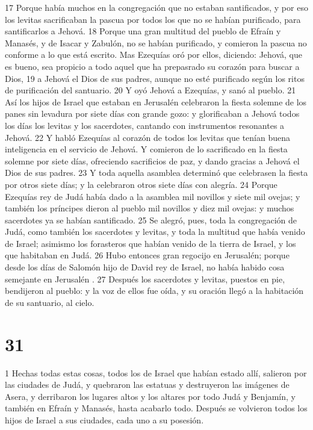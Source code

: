 17 Porque había muchos en la congregación que no estaban santificados, y por eso los levitas sacrificaban la pascua por todos los que no se habían purificado, para santificarlos a Jehová.
18 Porque una gran multitud del pueblo de Efraín y Manasés, y de Isacar y Zabulón, no se habían purificado, y comieron la pascua no conforme a lo que está escrito. Mas Ezequías oró por ellos, diciendo: Jehová, que es bueno, sea propicio a todo aquel que ha prepasrado su corazón para buscar a Dios,
19 a Jehová el Dios de sus padres, aunque no esté purificado según los ritos de  purificación del santuario.
20 Y oyó Jehová a Ezequías, y sanó al pueblo.
21 Así los hijos de Israel que estaban en Jerusalén celebraron la fiesta solemne de los panes sin levadura por siete días con grande gozo: y glorificaban a Jehová todos los días los levitas y los sacerdotes, cantando con instrumentos resonantes a Jehová.
22 Y habló Ezequías al corazón de todos los levitas que tenían buena inteligencia en el servicio de Jehová. Y comieron de lo sacrificado en la fiesta solemne por siete días, ofreciendo sacrificios de paz, y dando gracias a Jehová el Dios de sus padres.
23 Y toda aquella asamblea determinó que celebrasen la fiesta por otros siete días; y la celebraron otros siete días con alegría.
24 Porque Ezequías rey de Judá había dado a la asamblea mil novillos y siete mil ovejas; y también los príncipes dieron al pueblo mil novillos y diez mil ovejas: y muchos sacerdotes ya se habían santificado.
25 Se alegró, pues, toda la congregación de Judá, como también los sacerdotes y levitas, y toda la multitud que había venido de Israel; asimismo los forasteros que habían venido de la tierra de Israel, y los que habitaban en Judá.
26 Hubo entonces gran regocijo en Jerusalén; porque desde los días de Salomón hijo de David rey de Israel, no había habido cosa semejante en Jerusalén .
27 Después los sacerdotes y levitas, puestos en pie, bendijeron al pueblo: y la voz de ellos fue oída, y su oración llegó a la habitación de su santuario, al cielo.

\chapter{31}

1 Hechas todas estas cosas, todos los de Israel que habían estado allí, salieron por las ciudades de Judá, y quebraron las estatuas y destruyeron las imágenes de Asera, y derribaron los lugares altos y los altares por todo Judá y Benjamín, y también en Efraín y Manasés, hasta acabarlo todo. Después se volvieron todos los hijos de Israel a sus ciudades, cada uno a su posesión.
